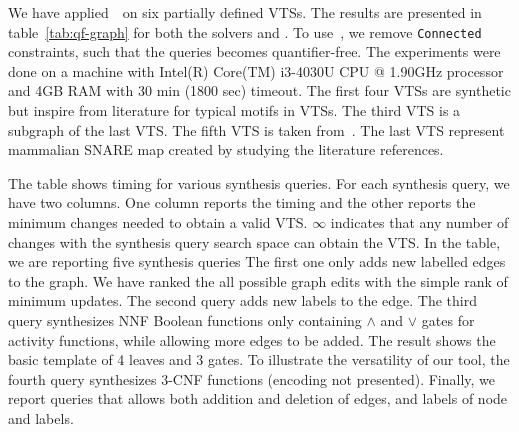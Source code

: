 We have applied~\ourtool~on six partially defined VTSs.
%
The results are presented in table~\ref{tab:qf-graph} for both the solvers
\depqbf and \zthree.
%
To use~\zthree, we remove \texttt{Connected} constraints, such that the queries becomes
quantifier-free.
%
%
The experiments were done on a machine with Intel(R) Core(TM) i3-4030U
CPU @ 1.90GHz processor and 4GB RAM with 30 min (1800 sec) timeout.
%
The first four VTSs are synthetic but inspire from literature for
typical motifs in VTSs. 
The third VTS is a subgraph of the last VTS.
%
%
The fifth VTS is taken from~\cite{burri2004complete}.
%
The last VTS represent mammalian SNARE map created by studying the literature references.  

The table shows timing for various synthesis queries.
%
For each synthesis query, we have two columns.
%
One column reports the timing and the other reports the minimum changes
needed to obtain a valid VTS.
%
$\infty$ indicates that any number of changes with the synthesis query
search space can obtain the VTS.
%
In the table, we are reporting five synthesis queries
%
The first one only adds new labelled edges to the graph.
%
We have ranked the all possible graph edits with the simple rank of
minimum updates.
%
The second query adds new labels to the edge.
%
The third query synthesizes NNF Boolean functions only containing
$\land$ and $\lor$ gates for activity functions, while allowing
more edges to be added.
%
The result shows the basic template of 4 leaves and 3 gates.
%
%
To illustrate the versatility of our tool, the fourth query
synthesizes $3$-CNF functions (encoding not presented).
%
Finally, we report queries that allows both addition and deletion of edges, and labels
of node and labels. 


%
%

